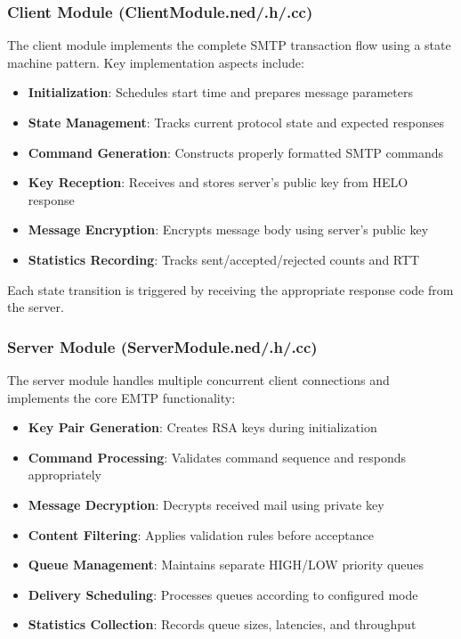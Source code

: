 \documentclass[12pt]{article}
\begin{document}
	\subsubsection{Client Module (ClientModule.ned/.h/.cc)}
	
	The client module implements the complete SMTP transaction flow using a state machine pattern. Key implementation aspects include:
	
	\begin{itemize}
		\item \textbf{Initialization}: Schedules start time and prepares message parameters
		\item \textbf{State Management}: Tracks current protocol state and expected responses
		\item \textbf{Command Generation}: Constructs properly formatted SMTP commands
		\item \textbf{Key Reception}: Receives and stores server's public key from HELO response
		\item \textbf{Message Encryption}: Encrypts message body using server's public key
		\item \textbf{Statistics Recording}: Tracks sent/accepted/rejected counts and RTT
	\end{itemize}
	
	Each state transition is triggered by receiving the appropriate response code from the server.
	
	\subsubsection{Server Module (ServerModule.ned/.h/.cc)}
	
	The server module handles multiple concurrent client connections and implements the core EMTP functionality:
	
	\begin{itemize}
		\item \textbf{Key Pair Generation}: Creates RSA keys during initialization
		\item \textbf{Command Processing}: Validates command sequence and responds appropriately
		\item \textbf{Message Decryption}: Decrypts received mail using private key
		\item \textbf{Content Filtering}: Applies validation rules before acceptance
		\item \textbf{Queue Management}: Maintains separate HIGH/LOW priority queues
		\item \textbf{Delivery Scheduling}: Processes queues according to configured mode
		\item \textbf{Statistics Collection}: Records queue sizes, latencies, and throughput
	\end{itemize}
	
\end{document}
